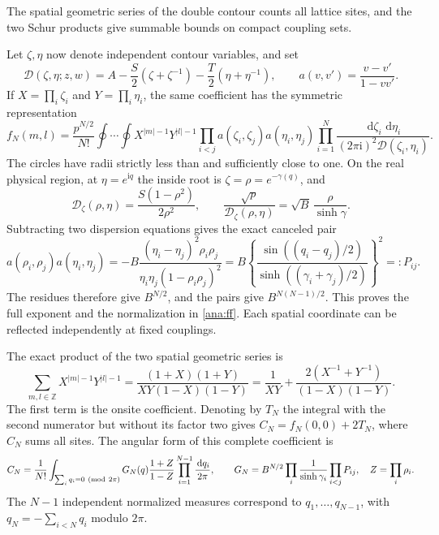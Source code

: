 \documentclass[11pt]{article}
\numberwithin{equation}{section}
\theoremstyle{definition}
\newcommand{\Z}{\mathbb Z}
\newcommand{\ii}{\mathrm i}
\newcommand{\dd}{\,\mathrm d}
\begin{document}
The spatial geometric series of the double contour counts all
lattice sites, and the two Schur products give summable bounds on
compact coupling sets.

Let \(\zeta,\eta\) now denote independent contour variables, and set
\[
 \mathcal D(\zeta,\eta;z,w)=
 A-\frac S2(\zeta+\zeta^{-1})
  -\frac T2(\eta+\eta^{-1}),\qquad
 a(v,v')=\frac{v-v'}{1-vv'}.
\]
If \(X=\prod_i\zeta_i\) and \(Y=\prod_i\eta_i\), the same coefficient
has the symmetric representation
\begin{equation}\label{ana:doublecorr}
 f_N(m,l)=\frac{p^{N/2}}{N!}\oint\cdots\oint
 X^{|m|-1}Y^{|l|-1}
 \prod_{i<j}a(\zeta_i,\zeta_j)a(\eta_i,\eta_j)
 \prod_{i=1}^N
 \frac{\dd\zeta_i\,\dd\eta_i}{(2\pi\ii)^2\mathcal D(\zeta_i,\eta_i)}.
\end{equation}
The circles have radii strictly less than and sufficiently close to
one. On the real physical region, at \(\eta=e^{\ii q}\) the
inside root is \(\zeta=\rho=e^{-\gamma(q)}\), and
\[
 \mathcal D_\zeta(\rho,\eta)
   =\frac{S(1-\rho^2)}{2\rho^2},\qquad
 \frac{\sqrt p}{\mathcal D_\zeta(\rho,\eta)}
   =\sqrt B\,\frac{\rho}{\sinh\gamma}.
\]
Subtracting two dispersion equations gives the exact canceled pair
\begin{equation}\label{ana:pair}
 a(\rho_i,\rho_j)a(\eta_i,\eta_j)
 =-B\frac{(\eta_i-\eta_j)^2\rho_i\rho_j}
          {\eta_i\eta_j(1-\rho_i\rho_j)^2}
 =B\left\{\frac{\sin((q_i-q_j)/2)}
       {\sinh((\gamma_i+\gamma_j)/2)}\right\}^{\!2}
 =:P_{ij}.
\end{equation}
The residues therefore give \(B^{N/2}\), and the pairs give
\(B^{N(N-1)/2}\). This proves the full exponent and the normalization
in \eqref{ana:ff}. Each spatial coordinate can be reflected
independently at fixed couplings.

The exact product of the two spatial geometric series is
\begin{equation}\label{ana:fullsites}
 \sum_{m,l\in\Z}X^{|m|-1}Y^{|l|-1}
 =\frac{(1+X)(1+Y)}{XY(1-X)(1-Y)}
 =\frac1{XY}+\frac{2(X^{-1}+Y^{-1})}{(1-X)(1-Y)}.
\end{equation}
The first term is the onsite coefficient. Denoting by \(T_N\)
the integral with the second numerator but without its factor two
gives \(C_N=f_N(0,0)+2T_N\), where \(C_N\) sums all sites.
The angular form of this complete coefficient is
\begin{equation}\label{ana:angular}
 C_N=\frac1{N!}
 \int_{\sum_iq_i=0\ ({\rm mod}\ 2\pi)}
 G_N(q)\frac{1+Z}{1-Z}
 \prod_{i=1}^{N-1}\frac{\dd q_i}{2\pi},\qquad
 G_N=B^{N/2}\prod_i\frac1{\sinh\gamma_i}\prod_{i<j}P_{ij},
 \quad Z=\prod_i\rho_i.
\end{equation}
The \(N-1\) independent normalized measures correspond to
\(q_1,\ldots,q_{N-1}\), with \(q_N=-\sum_{i<N}q_i\) modulo \(2\pi\).
\end{document}
